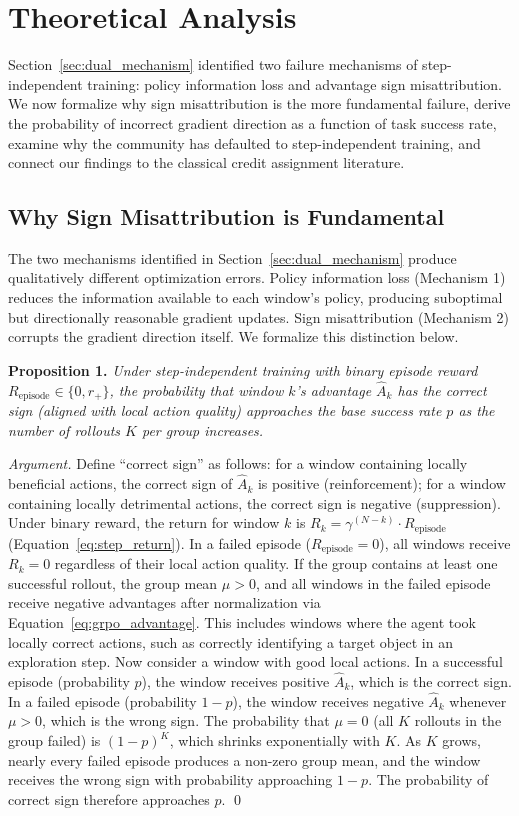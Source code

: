 \section{Theoretical Analysis}
\label{sec:theory}

Section~\ref{sec:dual_mechanism} identified two failure mechanisms of step-independent training: policy information loss and advantage sign misattribution. We now formalize why sign misattribution is the more fundamental failure, derive the probability of incorrect gradient direction as a function of task success rate, examine why the community has defaulted to step-independent training, and connect our findings to the classical credit assignment literature.

\subsection{Why Sign Misattribution is Fundamental}
\label{sec:sign_fundamental}

The two mechanisms identified in Section~\ref{sec:dual_mechanism} produce qualitatively different optimization errors. Policy information loss (Mechanism 1) reduces the information available to each window's policy, producing suboptimal but directionally reasonable gradient updates. Sign misattribution (Mechanism 2) corrupts the gradient direction itself. We formalize this distinction below.

\textbf{Proposition 1.} \textit{Under step-independent training with binary episode reward $R_{\text{episode}} \in \{0, r_+\}$, the probability that window $k$'s advantage $\hat{A}_k$ has the correct sign (aligned with local action quality) approaches the base success rate $p$ as the number of rollouts $K$ per group increases.}

\textit{Argument.} Define ``correct sign'' as follows: for a window containing locally beneficial actions, the correct sign of $\hat{A}_k$ is positive (reinforcement); for a window containing locally detrimental actions, the correct sign is negative (suppression). Under binary reward, the return for window $k$ is $R_k = \gamma^{(N-k)} \cdot R_{\text{episode}}$ (Equation~\ref{eq:step_return}). In a failed episode ($R_{\text{episode}} = 0$), all windows receive $R_k = 0$ regardless of their local action quality. If the group contains at least one successful rollout, the group mean $\mu > 0$, and all windows in the failed episode receive negative advantages after normalization via Equation~\ref{eq:grpo_advantage}. This includes windows where the agent took locally correct actions, such as correctly identifying a target object in an exploration step. Now consider a window with good local actions. In a successful episode (probability $p$), the window receives positive $\hat{A}_k$, which is the correct sign. In a failed episode (probability $1 - p$), the window receives negative $\hat{A}_k$ whenever $\mu > 0$, which is the wrong sign. The probability that $\mu = 0$ (all $K$ rollouts in the group failed) is $(1-p)^K$, which shrinks exponentially with $K$. As $K$ grows, nearly every failed episode produces a non-zero group mean, and the window receives the wrong sign with probability approaching $1-p$. The probability of correct sign therefore approaches $p$. \qed

